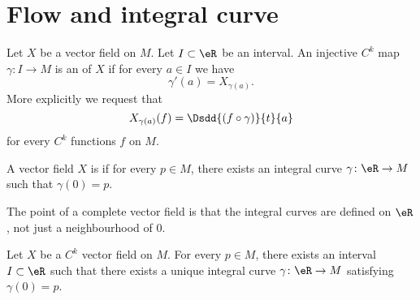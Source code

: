

\section{Flow and integral curve}

\begin{definition}      \label{DEFooWTNZooTbxJAH}
    Let \( X\) be a vector field on \( M\). Let \( I\subset \eR\) be an interval. An injective \( C^k\) map \( \gamma\colon I\to M\) is an  of \( X\) if for every \( a\in I\) we have
    \begin{equation}
        \gamma'(a)=X_{\gamma(a)}.
    \end{equation}
    More explicitly we request that
    \begin{equation}       
        X_{\gamma(a)}(f)=\Dsdd{ (f\circ \gamma) }{t}{a}
    \end{equation}
    for every \( C^k\) functions \( f\) on \( M\).
\end{definition}

\begin{definition}
    A vector field \( X\) is  if for every \( p\in M\), there exists an integral curve \( \gamma\colon \eR\to M\) such that \( \gamma(0)=p\).
\end{definition}

The point of a complete vector field is that the integral curves are defined on \( \eR\), not just a neighbourhood of \( 0\).

\begin{proposition}     \label{PROPooZOOCooExoXOv}
    Let \( X\) be a \( C^k\) vector field on \( M\). For every \( p\in M\), there exists an interval \( I\subset \eR\) such that there exists a unique integral curve \( \gamma\colon \eR\to M\) satisfying \( \gamma(0)=p\).
\end{proposition}

